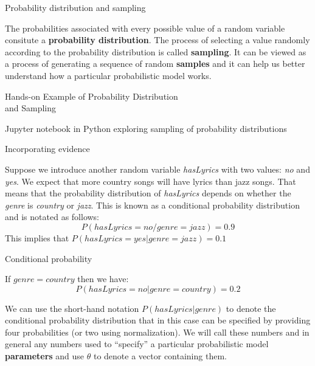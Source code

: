 \documentclass[12pt]{beamer}
\begin{document}
\begin{frame}{Probability distribution and sampling}

  The probabilities associated with every possible value of a random
  variable consitute a {\bf probability distribution}. The process of
  selecting a value randomly according to the probability distribution
  is called {\bf sampling}. It can be viewed as a process of generating
  a sequence of random {\bf samples} and it can help us better understand
  how a particular probabilistic model works. 
\end{frame}

\begin{frame}{Hands-on Example of Probability Distribution \\ and Sampling} 

Jupyter notebook in Python exploring sampling of probability
distributions
  
\end{frame}


\begin{frame}{Incorporating evidence}

  Suppose we introduce another random variable {\it hasLyrics} with two
  values: {\it no} and {\it yes}. We expect that more country
  songs will have lyrics than jazz songs. That means that the
  probability distribution of {\it hasLyrics} depends on whether the
  {\it genre} is {\it country} or {\it jazz}. This is known as a
  conditional probability distribution and is notated as follows:
  \[
  P(hasLyrics = no / genre = jazz) = 0.9 
  \]
  This implies that $P(hasLyrics = yes | genre = jazz) = 0.1$
  \end{frame} 

\begin{frame}{Conditional probability}

  If $genre = country$ then we have:
  \[
  P(hasLyrics  = no | genre=country) = 0.2 
  \]

  We can use the short-hand notation $P(hasLyrics|genre)$ to denote
  the conditional probability distribution that in this case can be
  specified by providing four probabilities (or two using
  normalization). We will call these numbers and in general any
  numbers used to ``specify'' a particular probabilistic model {\bf
    parameters} and use $\theta$ to denote a vector containing them.
\end{frame}
\end{document}
